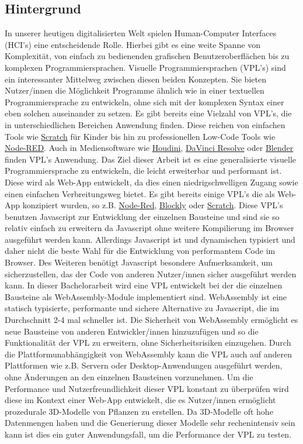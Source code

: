 \documentclass[ngerman]{article}
\begin{document}
\subsection{Hintergrund}
In unserer heutigen digitalisierten Welt spielen Human-Computer Interfaces (HCI's) eine entscheidende Rolle.
Hierbei gibt es eine weite Spanne von Komplexität, von einfach zu bedienenden grafischen Benutzeroberflächen bis zu komplexen Programmiersprachen. 
\br
Visuelle Programmiersprachen (VPL's) sind ein interessanter Mittelweg zwischen diesen beiden Konzepten. Sie bieten Nutzer/innen die Möglichkeit Programme ähnlich wie in einer textuellen Programmiersprache zu entwickeln, ohne sich mit der komplexen Syntax einer eben solchen auseinander zu setzen.
\br
Es gibt bereits eine Vielzahl von VPL's, die in unterschiedlichen Bereichen Anwendung finden.
Diese reichen von einfachen Tools wie \href{https://scratch.mit.edu/}{Scratch} für Kinder bis hin zu professionellen Low-Code Tools wie \href{https://nodered.org/}{Node-RED}. Auch in Mediensoftware wie \href{https://www.sidefx.com/products/houdini/}{Houdini}, \href{https://www.blackmagicdesign.com/de/products/davinciresolve/}{DaVinci Resolve} oder \href{https://www.blender.org/}{Blender} finden VPL's Anwendung.
\br
Das Ziel dieser Arbeit ist es eine generalisierte visuelle Programmiersprache zu entwickeln, die leicht erweiterbar und performant ist.
Diese wird als Web-App entwickelt, da dies einen niedrigschwelligen Zugang sowie einen einfachen Verbreitungsweg bietet.
\br
Es gibt bereits einige VPL's die als Web-App konzipiert wurden, so z.B. \href{https://nodered.org}{Node-Red},
\href{https://developers.google.com/blockly}{Blockly} oder \href{https://scratch.mit.edu/}{Scratch}. Diese VPL's benutzen Javascript zur Entwicklung der einzelnen Bausteine und sind sie so relativ einfach zu erweitern da Javascript ohne weitere Kompilierung im Browser ausgeführt werden kann. 
Allerdings Javascript ist  und dynamischen typisiert und daher nicht die beste Wahl für die Entwicklung von performantem Code im Browser. Des Weiteren benötigt Javascript besondere Aufmerksamkeit, um sicherzustellen, das der Code von anderen Nutzer/innen sicher ausgeführt werden kann. 
\br
In dieser Bachelorarbeit wird eine VPL entwickelt bei der die einzelnen Bausteine als WebAssembly-Module implementiert sind. 
WebAssembly ist eine statisch typisierte, performante und sichere Alternative zu Javascript, die im Durchschnitt 2-4 mal schneller ist. \cite{electronics11193217} \cite{Haas2017} Die Sicherheit von WebAssembly ermöglicht es neue Bausteine von anderen Entwickler/innen hinzuzufügen und so die Funktionalität der VPL zu erweitern, ohne Sicherheitsrisiken einzugehen. Durch die Plattformunabhängigkeit von WebAssembly kann die VPL auch auf anderen Plattformen wie z.B. Servern oder Desktop-Anwendungen ausgeführt werden, ohne Änderungen an den einzelnen Bausteinen vorzunehmen.
\br
Um die Performance und Nutzerfreundlichkeit dieser VPL konstant zu überprüfen wird diese im Kontext einer Web-App entwickelt, die es Nutzer/innen ermöglicht prozedurale 3D-Modelle von Pflanzen zu erstellen. 
Da 3D-Modelle oft hohe Datenmengen haben und die Generierung dieser Modelle sehr rechenintensiv sein kann ist dies ein guter Anwendungsfall, um die Performance der VPL zu testen.
\end{document}
